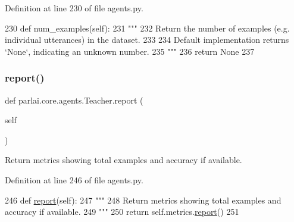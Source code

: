 Definition at line 230 of file agents.\+py.


\begin{DoxyCode}
230     \textcolor{keyword}{def }num\_examples(self):
231         \textcolor{stringliteral}{"""}
232 \textcolor{stringliteral}{        Return the number of examples (e.g. individual utterances) in the dataset.}
233 \textcolor{stringliteral}{}
234 \textcolor{stringliteral}{        Default implementation returns `None`, indicating an unknown number.}
235 \textcolor{stringliteral}{        """}
236         \textcolor{keywordflow}{return} \textcolor{keywordtype}{None}
237 
\end{DoxyCode}
\mbox{\label{classparlai_1_1core_1_1agents_1_1Teacher_aa0afab11fb5f3f26ac59576f064623a4}} 
\subsubsection{\texorpdfstring{report()}{report()}}
{\footnotesize\ttfamily def parlai.\+core.\+agents.\+Teacher.\+report (\begin{DoxyParamCaption}\item[{}]{self }\end{DoxyParamCaption})}

\begin{DoxyVerb}Return metrics showing total examples and accuracy if available.
\end{DoxyVerb}
 

Definition at line 246 of file agents.\+py.


\begin{DoxyCode}
246     \textcolor{keyword}{def }\hyperlink{namespaceprojects_1_1convai2_1_1eval__f1_a01a47b9c08dad189837a51f085defc45}{report}(self):
247         \textcolor{stringliteral}{"""}
248 \textcolor{stringliteral}{        Return metrics showing total examples and accuracy if available.}
249 \textcolor{stringliteral}{        """}
250         \textcolor{keywordflow}{return} self.metrics.\hyperlink{namespaceprojects_1_1convai2_1_1eval__f1_a01a47b9c08dad189837a51f085defc45}{report}()
251 
\end{DoxyCode}
\mbox{\label{classparlai_1_1core_1_1agents_1_1Teacher_a3b1fe4cf4ea53c9b2ce28435391ad081}} 
